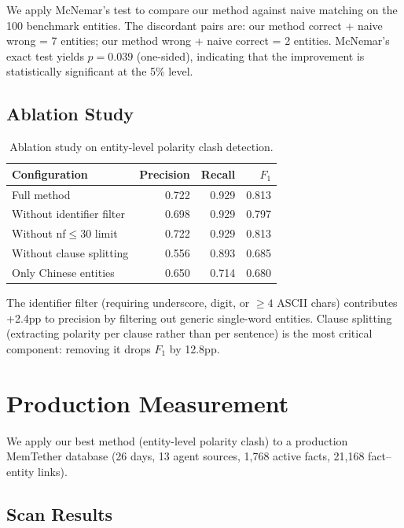 \documentclass{article}
\begin{document}
We apply McNemar's test to compare our method against naive matching on the 100 benchmark entities. The discordant pairs are: our method correct + naive wrong = 7 entities; our method wrong + naive correct = 2 entities. McNemar's exact test yields $p = 0.039$ (one-sided), indicating that the improvement is statistically significant at the 5\% level.

\subsection{Ablation Study}

\begin{table}[h]
\centering
\caption{Ablation study on entity-level polarity clash detection.}
\begin{tabular}{lrrr}
\toprule
Configuration & Precision & Recall & $F_1$ \\
\midrule
Full method & 0.722 & 0.929 & 0.813 \\
\midrule
Without identifier filter & 0.698 & 0.929 & 0.797 \\
Without nf$\leq$30 limit & 0.722 & 0.929 & 0.813 \\
Without clause splitting & 0.556 & 0.893 & 0.685 \\
Only Chinese entities & 0.650 & 0.714 & 0.680 \\
\bottomrule
\end{tabular}
\label{tab:ablation}
\end{table}

The identifier filter (requiring underscore, digit, or $\geq 4$ ASCII chars) contributes +2.4pp to precision by filtering out generic single-word entities. Clause splitting (extracting polarity per clause rather than per sentence) is the most critical component: removing it drops $F_1$ by 12.8pp.

\section{Production Measurement}
\label{sec:production}

We apply our best method (entity-level polarity clash) to a production MemTether database (26 days, 13 agent sources, 1{,}768 active facts, 21{,}168 fact--entity links).

\subsection{Scan Results}
\end{document}
